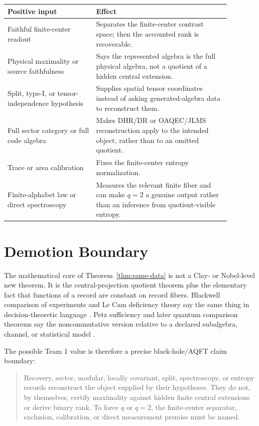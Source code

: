 \documentclass[12pt]{article}
\theoremstyle{definition}
\theoremstyle{remark}
\begin{document}
\begin{longtable}{>{\raggedright\arraybackslash}p{0.35\linewidth}>{\raggedright\arraybackslash}p{0.53\linewidth}}
\toprule
Positive input & Effect \\
\midrule
Faithful finite-center readout & Separates the finite-center contrast space;
then the accounted rank is recoverable. \\
\addlinespace
Physical maximality or source faithfulness & Says the represented algebra is
the full physical algebra, not a quotient of a hidden central extension. \\
\addlinespace
Split, type-I, or tensor-independence hypothesis & Supplies spatial tensor
coordinates instead of asking generated-algebra data to reconstruct them. \\
\addlinespace
Full sector category or full code algebra & Makes DHR/DR or OAQEC/JLMS
reconstruction apply to the intended object, rather than to an omitted quotient. \\
\addlinespace
Trace or area calibration & Fixes the finite-center entropy normalization. \\
\addlinespace
Finite-alphabet law or direct spectroscopy & Measures the relevant finite
fiber and can make \(q=2\) a genuine output rather than an inference from
quotient-visible entropy. \\
\bottomrule
\end{longtable}

\section{Demotion Boundary}

The mathematical core of Theorem~\ref{thm:same-data} is not a Clay- or
Nobel-level new theorem.  It is the central-projection quotient theorem plus
the elementary fact that functions of a record are constant on record fibers.
Blackwell comparison of experiments and Le Cam deficiency theory say the same
thing in decision-theoretic language \cite{Blackwell1951,Blackwell1953,
LeCam1964,LeCam1986}.  Petz sufficiency and later quantum comparison theorems
say the noncommutative version relative to a declared subalgebra, channel, or
statistical model \cite{Petz1986,Petz1988,Shmaya2005,Buscemi2012}.

The possible Team 1 value is therefore a precise black-hole/AQFT claim
boundary:

\begin{quote}
Recovery, sector, modular, locally covariant, split, spectroscopy, or entropy
records reconstruct the object supplied by their hypotheses.  They do not, by
themselves, certify maximality against hidden finite central extensions or
derive binary rank.  To force \(q\) or \(q=2\), the finite-center separator,
exclusion, calibration, or direct measurement premise must be named.
\end{quote}
\end{document}
